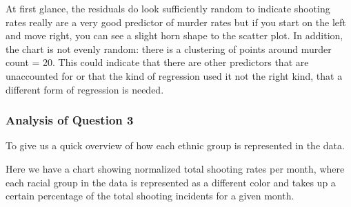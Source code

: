 \documentclass[
]{article}
\begin{document}
At first glance, the residuals do look sufficiently random to indicate
shooting rates really are a very good predictor of murder rates but if
you start on the left and move right, you can see a slight horn shape to
the scatter plot. In addition, the chart is not evenly random: there is
a clustering of points around murder count = 20. This could indicate
that there are other predictors that are unaccounted for or that the
kind of regression used it not the right kind, that a different form of
regression is needed.

\hypertarget{analysis-of-question-3}{%
\subsubsection{Analysis of Question 3}\label{analysis-of-question-3}}

To give us a quick overview of how each ethnic group is represented in
the data.

Here we have a chart showing normalized total shooting rates per month,
where each racial group in the data is represented as a different color
and takes up a certain percentage of the total shooting incidents for a
given month.
\end{document}
